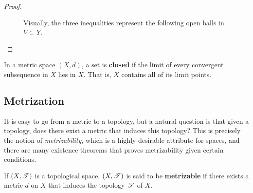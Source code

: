 \begin{proof}
    \begin{figure}[H]
      \centering 
      \caption{Visually, the three inequalities represent the following open balls in $V \subset Y$.} 
      \label{fig:uniform_limit}
    \end{figure}
  \end{proof}


  \begin{theorem}
    In a metric space $(X, d)$, a set is \textbf{closed} if the limit of every convergent subsequence in $X$ lies in $X$. That is, $X$ contains all of its limit points. 
  \end{theorem}

\subsection{Metrization}

  It is easy to go from a metric to a topology, but a natural question is that given a topology, does there exist a metric that induces this topology? This is precisely the notion of \textit{metrizability}, which is a highly desirable attribute for spaces, and there are many existence theorems that proves metrizability given certain conditions.

  \begin{definition}
    If $(X, \operatorname{\mathscr{T}})$ is a topological space, $(X, \operatorname{\mathscr{T}})$ is said to be \textbf{metrizable} if there exists a metric $d$ on $X$ that induces the topology $\operatorname{\mathscr{T}}$ of $X$.
  \end{definition}

